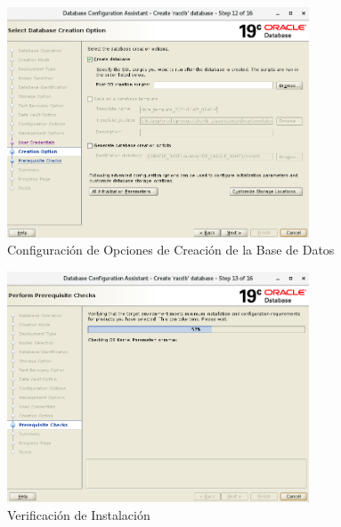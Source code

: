 \documentclass{article}
\begin{document}
\begin{figure}[H]
		\begin{center}
			\includegraphics[width=0.80\textwidth]{db_creation_13_creation_options.png}
		\end{center}
		\caption{Configuración de Opciones de Creación de la Base de Datos}
\end{figure}


\begin{figure}[H]
		\begin{center}
			\includegraphics[width=0.80\textwidth]{db_creation_14_pre_requisite_check.png}
		\end{center}
		\caption{Verificación de Instalación}
\end{figure}
\end{document}
